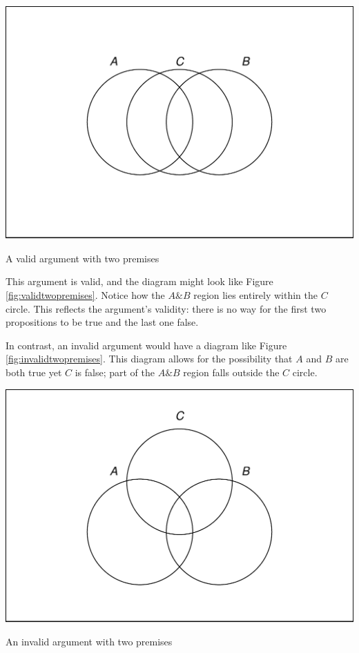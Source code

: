 \documentclass[justified]{tufte-book}
\renewcommand{\wedge}{\mathbin{\&}}
\theoremstyle{definition}
\theoremstyle{definition}
\theoremstyle{definition}
\theoremstyle{remark}
\begin{document}
\begin{marginfigure}
\includegraphics{_main_files/figure-latex/validtwopremises-1} \caption[A valid argument with two premises]{A valid argument with two premises}\label{fig:validtwopremises}
\end{marginfigure}

This argument is valid, and the diagram might look like Figure
\ref{fig:validtwopremises}. Notice how the \(A \wedge B\) region lies
entirely within the \(C\) circle. This reflects the argument's validity:
there is no way for the first two propositions to be true and the last
one false.

In contrast, an invalid argument would have a diagram like Figure
\ref{fig:invalidtwopremises}. This diagram allows for the possibility
that \(A\) and \(B\) are both true yet \(C\) is false; part of the
\(A \wedge B\) region falls outside the \(C\) circle.

\begin{marginfigure}
\includegraphics{_main_files/figure-latex/invalidtwopremises-1} \caption[An invalid argument with two premises]{An invalid argument with two premises}\label{fig:invalidtwopremises}
\end{marginfigure}
\end{document}
